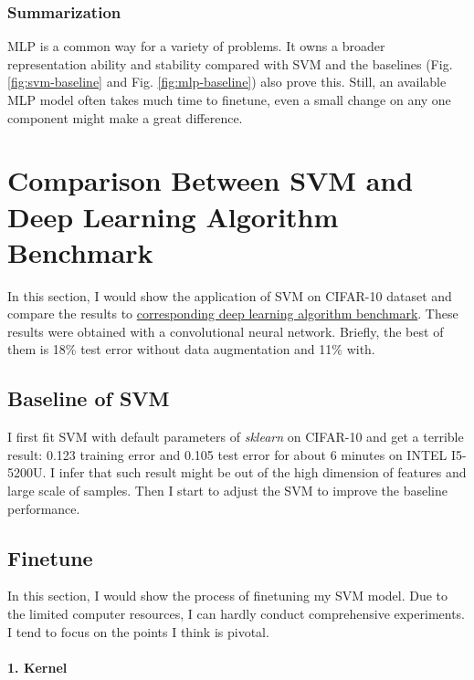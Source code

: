 \documentclass[12pt,a4paper]{article}
\theoremstyle{definition}
\begin{document}
\subsubsection{Summarization}
\label{sec:sum-mlp}

MLP is a common way for a variety of problems. It owns a broader representation ability and stability compared with SVM and the baselines (Fig. \ref{fig:svm-baseline} and Fig. \ref{fig:mlp-baseline}) also prove this. Still, an available MLP model often takes much time to finetune, even a small change on any one component might make a great difference.

\section{Comparison Between SVM and Deep Learning Algorithm Benchmark}

In this section, I would show the application of SVM on CIFAR-10 dataset \cite{cifar-10} and compare the results to \href{https://code.google.com/archive/p/cuda-convnet/}{corresponding deep learning algorithm benchmark}. These results were obtained with a convolutional neural network. Briefly, the best of them is 18\% test error without data augmentation and 11\% with.

\subsection{Baseline of SVM}
\vspace{0.01\linewidth}

I first fit SVM with default parameters of \textit{sklearn} on CIFAR-10 and get a terrible result: 0.123 training error and 0.105 test error for about 6 minutes on INTEL I5-5200U. I infer that such result might be out of the high dimension of features and large scale of samples. Then I start to adjust the SVM to improve the baseline performance.

\subsection{Finetune}
\label{sec:finetune}

In this section, I would show the process of finetuning my SVM model. Due to the limited computer resources, I can hardly conduct comprehensive experiments. I tend to focus on the points I think is pivotal.

\paragraph{1. Kernel}
\end{document}
